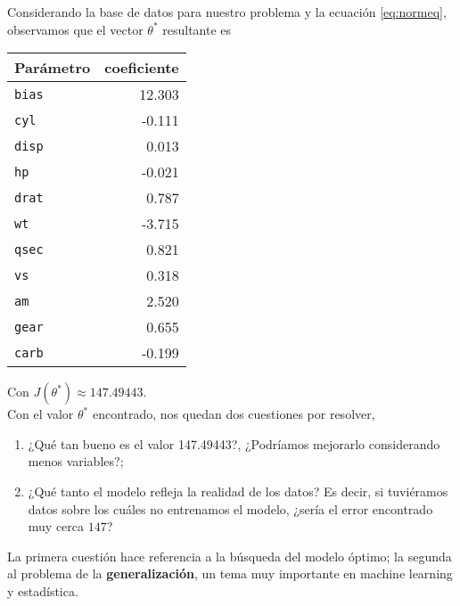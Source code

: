 \documentclass[11pt]{article}
\begin{document}
Considerando la base de datos para nuestro problema y la ecuación \ref{eq:normeq}, observamos que el vector $\theta^*$ resultante es

\begin{center}
\begin{tabular}{lr}
Parámetro & coeficiente\\
\midrule
\texttt{bias} & 12.303\\
 \texttt{cyl} & -0.111 \\
\texttt{disp} & 0.013 \\ 
  \texttt{hp} & -0.021 \\
\texttt{drat} & 0.787 \\
  \texttt{wt} & -3.715\\
\texttt{qsec} & 0.821\\
  \texttt{vs} & 0.318\\
  \texttt{am} & 2.520\\
\texttt{gear} & 0.655\\
\texttt{carb} & -0.199\\
\end{tabular}
\end{center}

Con $J(\theta^*) \approx 147.49443$.\\

Con el valor $\theta^*$ encontrado, nos quedan dos cuestiones por resolver,
\begin{enumerate}
	\item ¿Qué tan bueno es el valor 147.49443?, ¿Podríamos mejorarlo considerando menos variables?;
	\item ¿Qué tanto el modelo refleja la realidad de los datos? Es decir, si tuviéramos datos sobre los cuáles no entrenamos el modelo, ¿sería el error encontrado muy cerca $147$?
\end{enumerate}

La primera cuestión hace referencia a la búsqueda del modelo óptimo; la segunda al problema de la \textbf{generalización}, un tema muy importante en machine learning y estadística.
\end{document}
